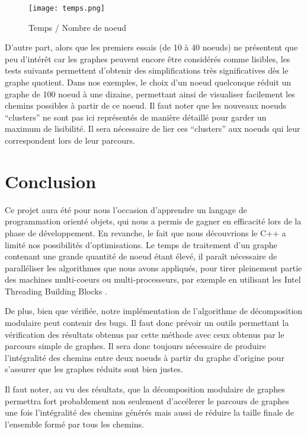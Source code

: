 \documentclass[pdftex,a4paper,titlepage,11pt,openright]{article}
\newcommand{\clearemptydoublepage}{
	\newpage{\pagestyle{empty}\cleardoublepage}}
\begin{document}
\begin{figure}[!h]
	\begin{center}
	\texttt{[image: temps.png]}
	\caption{Temps / Nombre de noeud}
	\end{center}
\end{figure}

\newpage

D'autre part, alors que les premiers essais (de 10 à 40 noeuds) ne présentent que peu d'intérêt car les graphes peuvent encore être considérés comme lisibles, les tests suivants permettent d'obtenir des simplifications très significatives dès le graphe quotient. Dans nos exemples, le choix d'un noeud quelconque réduit un graphe de 100 noeud à une dizaine, permettant ainsi de visualiser facilement les chemins possibles à partir de ce noeud. Il faut noter que les nouveaux noeuds ``clusters'' ne sont pas ici représentés de manière détaillé pour garder un maximum de lisibilité. Il sera nécessaire de lier ces ``clusters'' aux noeuds qui leur correspondent lors de leur parcours.

\clearemptydoublepage

\section*{Conclusion} 

Ce projet aura été pour nous l'occasion d'apprendre un langage de programmation orienté objets, qui nous a permis de gagner en efficacité lors de la phase de développement. En revanche, le fait que nous découvrions le C++ a limité nos possibilités d'optimisations. Le temps de traitement d'un graphe contenant une grande quantité de noeud étant élevé, il paraît nécessaire de paralléliser les algorithmes que nous avons appliqués, pour tirer pleinement partie des machines multi-coeurs ou multi-processeurs, par exemple en utilisant les Intel Threading Building Blocks \cite{TBB}.

De plus, bien que vérifiée, notre implémentation de l'algorithme de décomposition modulaire peut contenir des bugs. Il faut donc prévoir un outils permettant la vérification des résultats obtenus par cette méthode avec ceux obtenus par le parcours simple de graphes. Il sera donc toujours nécessaire de produire l'intégralité des chemins entre deux noeuds à partir du graphe d'origine pour s'assurer que les graphes réduits sont bien justes.

Il faut noter, au vu des résultats, que la décomposition modulaire de graphes permettra fort probablement non seulement d'accélerer le parcours de graphes une fois l'intégralité des chemins générés mais aussi de réduire la taille finale de l'ensemble formé par tous les chemins.
\end{document}
